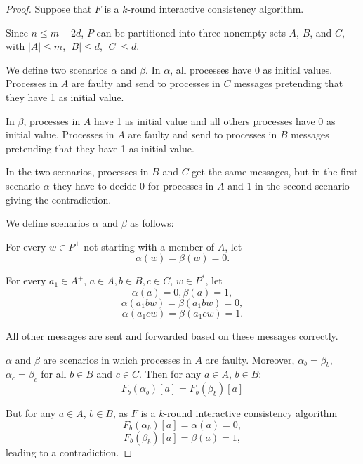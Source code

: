 \begin{proof}
  Suppose that $F$ is a $k$-round  interactive consistency algorithm. 
  
  Since $n \leqslant
  m+2d$, $P$ can be partitioned into three nonempty sets $A$, $B$, and $C$,
  with $| A | \leqslant m$, $| B | \leqslant d$, $| C | \leqslant d$. 
  
   We define two scenarios $\alpha$ and $\beta$.
  In $\alpha$, all processes have 0 as initial values.
  Processes in $A$ are faulty and send  to processes in $C$  messages
  pretending that they have  1 as initial value. 
  
   In $\beta$, processes in $A$ have 1 as initial value and all  others processes have 0 as initial value.
  Processes in $A$ are faulty and send to processes in $B$ messages 
  pretending that they have 1 as initial value.
  

  
    In the two scenarios, processes in $B$ and $C$  get the same messages, but in the first scenario $\alpha$
  they have to decide 0 for processes in $A$ and $1$ in the second scenario giving the contradiction.
  
  We
  define scenarios $\alpha$ and $\beta$ as follows:
  \begin{enumerateroman}
    \item For every $w \in P^{+}$ not starting with a member of $A$, let
    \[ \alpha ( w ) = \beta ( w ) =0. \]
    \item For every $a_{1}  \in A^{+}$, $a \in A,b \in B,c
    \in C$, $w \in P^{\ast}$, let
    \[ \alpha ( a ) =0, \beta ( a ) =1, \]
    \[ \alpha ( a_{1}  b w ) = \beta ( a_{1}  b w ) =0, \]
    \[ \alpha ( a_{1}  c w ) = \beta ( a_{1}  c w ) =1. \]
    \item All other messages are sent and forwarded based on these messages
    correctly.
  \end{enumerateroman}
  
  $\alpha$ and $\beta$ are scenarios in which processes in $A$ are faulty.
  Moreover, $\alpha_{b} =
  \beta_{b}$, $\alpha_{c} = \beta_{c}$ for all $b \in B$ and $c \in C$. 
  Then for any $a \in A$, $b \in B$:
   \[ F_b ( \alpha_{b} )[a] =F_b ( \beta_{b} )[a]  \]

  
But for any $a \in A$, $b \in B$, as $F$ is a $k$-round  interactive consistency algorithm
  \[ F_b ( \alpha_{b} )[a] = \alpha ( a )
     =0, \]
       \[ F_b ( \beta_{b} )[a] = \beta ( a )
     =1, \]
  leading to a contradiction.
\end{proof}

